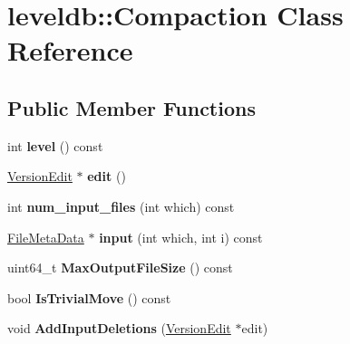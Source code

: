 \hypertarget{classleveldb_1_1_compaction}{}\section{leveldb\+:\+:Compaction Class Reference}
\label{classleveldb_1_1_compaction}
\subsection*{Public Member Functions}
\begin{DoxyCompactItemize}
\item 
\mbox{\label{classleveldb_1_1_compaction_a716f0b644cf403944db14e7622519bd3}} 
int {\bfseries level} () const
\item 
\mbox{\label{classleveldb_1_1_compaction_a122e4f7b4fdb6c0d1862624742b34b3d}} 
\mbox{\hyperlink{classleveldb_1_1_version_edit}{Version\+Edit}} $\ast$ {\bfseries edit} ()
\item 
\mbox{\label{classleveldb_1_1_compaction_a701f2fa2d3fb00af0847aa570506e743}} 
int {\bfseries num\+\_\+input\+\_\+files} (int which) const
\item 
\mbox{\label{classleveldb_1_1_compaction_aa0999bbaeb6993759b3e76e3516589d3}} 
\mbox{\hyperlink{structleveldb_1_1_file_meta_data}{File\+Meta\+Data}} $\ast$ {\bfseries input} (int which, int i) const
\item 
\mbox{\label{classleveldb_1_1_compaction_ad4487eda793d622dbcf0483663fef2ed}} 
uint64\+\_\+t {\bfseries Max\+Output\+File\+Size} () const
\item 
\mbox{\label{classleveldb_1_1_compaction_a85ab53d400d49d1dfb7e8f63017fef99}} 
bool {\bfseries Is\+Trivial\+Move} () const
\item 
\mbox{\label{classleveldb_1_1_compaction_abb1acdc9b882a7497603b13386e7e1a7}} 
void {\bfseries Add\+Input\+Deletions} (\mbox{\hyperlink{classleveldb_1_1_version_edit}{Version\+Edit}} $\ast$edit)
\item 
\mbox{\label{classleveldb_1_1_compaction_ae982beb6ee52d92de76a363ef0eefc29}} 

\end{DoxyCompactItemize}
